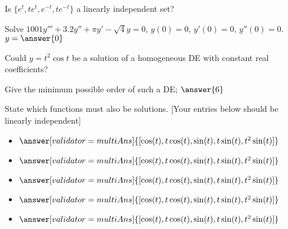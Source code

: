 \documentclass{ximera}
\begin{document}
\begin{exercise}
    Is $\{e^t, te^t, e^{-t}, te^{-t}\}$ a linearly independent set?
    \begin{multipleChoice}
    \end{multipleChoice}
\end{exercise}

\begin{exercise}%
    Solve $1001y'''+3.2y''+\pi y'-\sqrt{4} y = 0$, $y(0)=0$, $y'(0) = 0$, $y''(0) = 0$. $y = \answer{0}$
\end{exercise}

\begin{exercise}
    Could $y=t^2\cos t$ be a solution of a homogeneous DE with constant real coefficients? %
    \begin{multipleChoice}
    \end{multipleChoice}
    \begin{problem}
        Give the minimum possible order of such a DE; $\answer{6}$ 
        \begin{problem}
            State which functions must also be solutions. [Your entries below should be linearly independent] %
            \begin{itemize}
                \item $\answer[validator=multiAns]{[\cos(t), t\cos(t), \sin(t), t\sin(t), t^2\sin(t)]}$
                \item $\answer[validator=multiAns]{[\cos(t), t\cos(t), \sin(t), t\sin(t), t^2\sin(t)]}$
                \item $\answer[validator=multiAns]{[\cos(t), t\cos(t), \sin(t), t\sin(t), t^2\sin(t)]}$
                \item $\answer[validator=multiAns]{[\cos(t), t\cos(t), \sin(t), t\sin(t), t^2\sin(t)]}$
                \item $\answer[validator=multiAns]{[\cos(t), t\cos(t), \sin(t), t\sin(t), t^2\sin(t)]}$
            \end{itemize}
            
        \end{problem}
    \end{problem}
\end{exercise}
\end{document}
